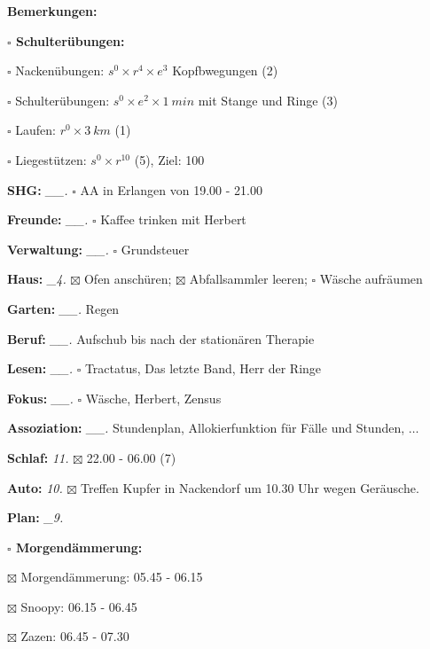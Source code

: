 \documentclass[10pt,a4paper]{article}
\newcommand\prop[1] {{\color {alizarin} {\bf #1}}}             %
\newcommand\opti[1] {{\color {amethyst} {\bf #1}}}             %
\newcommand\mand[1] {{\color {burntorange} {\bf #1}}}          %
\newcommand\topspace{\vskip -15pt \hskip 20pt}
\newcommand\bottomspace{\vskip 4pt}
\newcommand\n[1] { {\sl #1.} \hskip 5pt }
\begin{document}
\begin{mdframed}[style=daystyle]
\begin{labeling}{{\mand {Bemerkungen:}}}
\begin{minipage}{0.75\textwidth}
\begin{labeling}{\prop {$\square$ {Schulterübungen:}}}
        \setlength\itemsep{-3pt}
      \item[$\square$ Nackenübungen:]   $s^0 \times r^4 \times e^3$ Kopfbwegungen (2)
      \item[$\square$ Schulterübungen:] $s^0 \times e^2 \times 1\ min$ mit Stange und Ringe (3)
      \item[$\square$ Laufen:]          $r^0 \times 3\ km$ (1)
      \item[$\square$ Liegestützen:]    $s^0 \times r^{10}$ (5), Ziel: 100
      \end{labeling}
    \end{minipage}
    \bottomspace        
  \item[{\mand {SHG:}}]          \n{\_\_} $\square$ AA in Erlangen von 19.00 - 21.00
  \item[{\mand {Freunde:}}]      \n{\_\_} $\square$ Kaffee trinken mit Herbert
  \item[{\mand {Verwaltung:}}]   \n{\_\_} $\square$ Grundsteuer
  \item[{\mand {Haus:}}]          \n{\_4} $\boxtimes$ Ofen anschüren; $\boxtimes$ Abfallsammler leeren;
        $\square$ Wäsche aufräumen
  \item[{\mand {Garten:}}]       \n{\_\_} Regen
  \item[{\mand {Beruf:}}]        \n{\_\_} Aufschub bis nach der stationären Therapie
  \item[{\mand {Lesen:}}]        \n{\_\_} $\square$ Tractatus, Das letzte Band, Herr der Ringe
  \item[{\mand {Fokus:}}]        \n{\_\_} $\square$ Wäsche, Herbert, Zensus
  \item[{\mand {Assoziation:}}]  \n{\_\_} Stundenplan, Allokierfunktion für Fälle und Stunden, $\ldots$
  \item[{\mand {Schlaf:}}]         \n{11} $\boxtimes$ 22.00 - 06.00 (7)
  \item[{\opti {Auto:}}]           \n{10} $\boxtimes$ Treffen Kupfer in Nackendorf um 10.30 Uhr wegen Geräusche.
  \item[{\mand {Plan:}}]          \n{\_9}
    \topspace
    \begin{minipage}{0.75\textwidth}  
      \begin{labeling}{\prop {$\square$ {Morgendämmerung:}}} 
        \setlength\itemsep{-3pt}
      \item[$\boxtimes$ Morgendämmerung:] 05.45 - 06.15
      \item[$\boxtimes$ Snoopy:]          06.15 - 06.45
      \item[$\boxtimes$ Zazen:]           06.45 - 07.30

\end{labeling}
\end{minipage}
\end{labeling}
\end{mdframed}
\end{document}
